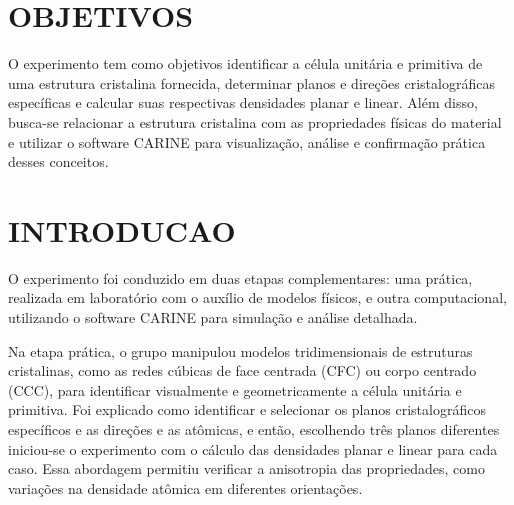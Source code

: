 \documentclass[10pt,twocolumn,letterpaper]{article}
\begin{document}

\section{OBJETIVOS}

\hspace{1cm} O experimento tem como objetivos identificar a célula unitária e primitiva de uma estrutura cristalina fornecida, determinar planos e direções cristalográficas específicas e calcular suas respectivas densidades planar e linear. Além disso, busca-se relacionar a estrutura cristalina com as propriedades físicas do material e utilizar o software CARINE para visualização, análise e confirmação prática desses conceitos. 

\vspace{.75cm}

\section{INTRODUCAO}
\hspace{1cm} O experimento foi conduzido em duas etapas complementares: uma prática, realizada em laboratório com o auxílio de modelos físicos, e outra computacional, utilizando o software CARINE para simulação e análise detalhada. 

\hspace{1cm} Na etapa prática, o grupo manipulou modelos tridimensionais de estruturas cristalinas, como as redes cúbicas de face centrada (CFC) ou corpo centrado (CCC), para identificar visualmente e geometricamente a célula unitária e primitiva. Foi explicado como identificar e  selecionar os planos cristalográficos específicos e as direções e as atômicas, e então, escolhendo três planos diferentes iniciou-se o experimento com o cálculo das densidades planar e linear para cada caso. Essa abordagem permitiu verificar a anisotropia das propriedades, como variações na densidade atômica em diferentes orientações.
\end{document}
